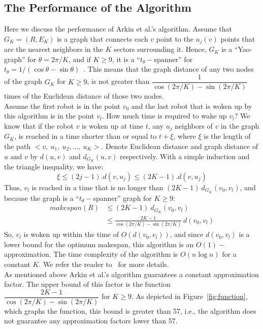 \documentclass[review]{elsarticle}
\begin{document}
\subsection{The Performance of the Algorithm}
Here we discuss the performance of Arkin et al.'s algorithm. Assume that ${ G_K=(R,E_K) }$ is a graph that connects each $v$ point to the $u_j(v)$ points that are the nearest neighbors in the $K$ sectors surrounding it. Hence, $G_K$ is a ``Yao-graph'' for ${ \theta=2\pi/K }$, and if ${ K\geq 9 }$, it is a ``$t_\theta-$spanner'' for ${ t_\theta=1/(\cos\theta-\sin\theta) }$~\cite{Keil1992}.
This means that the graph distance of any two nodes of the graph $G_K$ for ${ K\geq 9 }$, is not greater than ${ \dfrac{1}{\cos(2\pi/K)-\sin(2\pi/K)} }$ times of the Euclidean distance of those two nodes. \\
Assume the first robot is in the point $v_0$ and the last robot that is woken up by this algorithm is in the point $v_l$. How much time is required to wake up $v_l$? We know that if the robot $v$ is woken up at time $t$, any $u_j$ neighbors of $v$ in the graph $G_K$, is reached in a time shorter than or equal to ${ t+\xi }$, where $\xi$ is the length of the path ${ <v,~u_1,~u_2,...,~u_K> }$. Denote Euclidean distance and graph distance of $u$ and $v$ by ${ d(u,v) }$ and ${ d_{G_K}(u,v) }$ respectively. With a simple induction and the triangle inequality, we have:
$$ \xi \leq (2j-1).d(v,u_j ) \leq (2K-1).d(v,u_j ) $$
Thus, $v_l$ is reached in a time that is no longer than ${ (2K-1)~d_{G_K}(v_0,v_l) }$, and because the graph is a ``$t_\theta-$spanner'' graph for ${ K\geq 9 }$:
\begin{align}
makespan(R)	&\leq (2K-1)~d_{G_K}(v_0,v_l) \nonumber \\
			&\leq \frac{2K-1}{\cos(2\pi/K)-\sin(2\pi/K)}~d(v_0,v_l) \nonumber
\end{align}
So, $v_l$ is woken up within the time of ${ O(d(v_0,v_l)) }$, and since ${ d(v_0,v_l) }$ is a lower bound for the optimum makespan, this algorithm is an ${ O(1)- }$approximation. The time complexity of the algorithm is ${ O(n\log n) }$ for a constant $K$. We refer the reader to~\cite{Arkin2006} for more details.\\
As mentioned above Arkin et al.'s algorithm guarantees a constant approximation factor. The upper bound of this factor is the function
${ \dfrac{2K-1}{\cos(2\pi/K)-\sin(2\pi/K)} }$ for ${ K\geq 9 }$. As depicted in Figure~\ref{fig:function}, which graphs the function, this bound is greater than 57, i.e., the algorithm does not guarantee any approximation factors lower than 57.
\end{document}
